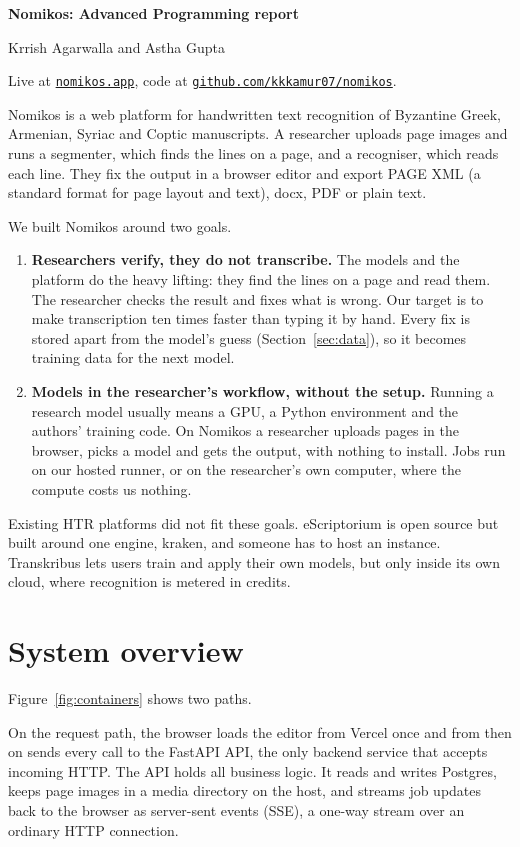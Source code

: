 \documentclass[11pt,a4paper]{article}
\begin{document}
{\LARGE\bfseries Nomikos: Advanced Programming report}\par
\smallskip
{\large Krrish Agarwalla and Astha Gupta}\par
\smallskip
{\small Live at \href{https://nomikos.app}{\texttt{nomikos.app}}, code at \href{https://github.com/kkkamur07/nomikos}{\texttt{github.com/kkkamur07/nomikos}}.}

Nomikos is a web platform for handwritten text recognition of Byzantine Greek, Armenian, Syriac and Coptic manuscripts. A researcher uploads page images and runs a segmenter, which finds the lines on a page, and a recogniser, which reads each line. They fix the output in a browser editor and export PAGE XML (a standard format for page layout and text), docx, PDF or plain text.

We built Nomikos around two goals.
\begin{enumerate}
  \item \textbf{Researchers verify, they do not transcribe.} The models and the platform do the heavy lifting: they find the lines on a page and read them. The researcher checks the result and fixes what is wrong. Our target is to make transcription ten times faster than typing it by hand. Every fix is stored apart from the model's guess (Section~\ref{sec:data}), so it becomes training data for the next model.
  \item \textbf{Models in the researcher's workflow, without the setup.} Running a research model usually means a GPU, a Python environment and the authors' training code. On Nomikos a researcher uploads pages in the browser, picks a model and gets the output, with nothing to install. Jobs run on our hosted runner, or on the researcher's own computer, where the compute costs us nothing.
\end{enumerate}

Existing HTR platforms did not fit these goals. eScriptorium is open source but built around one engine, kraken, and someone has to host an instance. Transkribus lets users train and apply their own models, but only inside its own cloud, where recognition is metered in credits.

\section{System overview}

Figure~\ref{fig:containers} shows two paths.

On the request path, the browser loads the editor from Vercel once and from then on sends every call to the FastAPI API, the only backend service that accepts incoming HTTP. The API holds all business logic. It reads and writes Postgres, keeps page images in a media directory on the host, and streams job updates back to the browser as server-sent events (SSE), a one-way stream over an ordinary HTTP connection.
\end{document}
